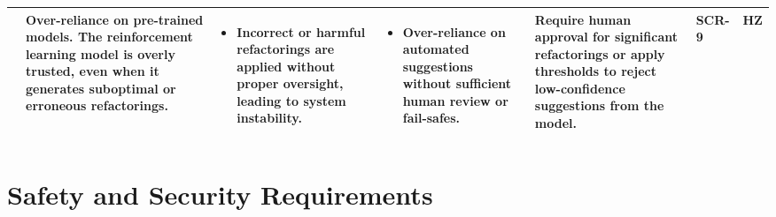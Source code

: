 \documentclass{article}
\newcounter{hazard}
\newcommand{\showmycounter}{\stepcounter{hazard}\thehazard}
\begin{document}
\begin{landscape}
\begin{longtable}{|p{0.6cm}|p{4cm}p{4cm}p{4cm}p{4cm}p{1.5cm}p{1.5cm}|}
    & Over-reliance on pre-trained models. The reinforcement learning model is overly trusted, even when it generates suboptimal or erroneous refactorings. & 
    \begin{itemize}[wide=0pt]
        \item Incorrect or harmful refactorings are applied without proper oversight, leading to system instability.
    \end{itemize} &
    \begin{itemize}[wide=0pt]
        \item Over-reliance on automated suggestions without sufficient human review or fail-safes.
    \end{itemize}
    & Require human approval for significant refactorings or apply thresholds to reject low-confidence suggestions from the model. & SCR-9 & HZ \showmycounter \\ \cline{2-7}\hline
     \bottomrule
    \end{longtable}


\end{landscape}




\section{Safety and Security Requirements}
\end{document}
